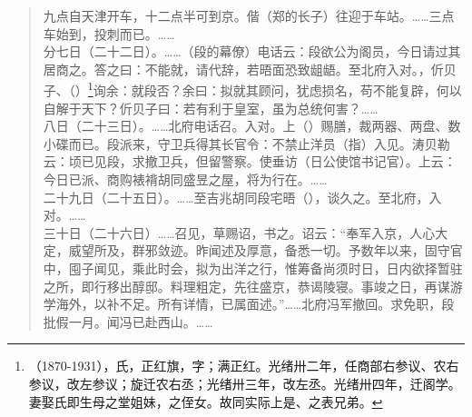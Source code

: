\begin{quote}
	九点自天津开车，十二点半可到京。偕（郑的长子）往迎于车站。……三点车始到，投刺而已。……\\

分七日（二十二日）。……（段的幕僚）电话云：段欲公为阁员，今日请过其居商之。答之曰：不能就，请代辞，若晤面恐致龃龉。至北府入对。，伒贝子、（）\footnote{（1870-1931），氏，正红旗，字；满正红。光绪卅二年，任商部右参议、农右参议，改左参议；旋迁农右丞；光绪卅三年，改左丞。光绪卅四年，迁阁学。妻娶氏即生母之堂姐妹，之侄女。故同实际上是、之表兄弟。}询余：就段否？余曰：拟就其顾问，犹虑损名，苟不能复辟，何以自解于天下？伒贝子曰：若有利于皇室，虽为总统何害？……\\

八日（二十三日）。……北府电话召。入对。上（）赐膳，裁两器、两盘、数小碟而已。段派来，守卫兵得其长官令：不禁止洋员（指）入见。涛贝勒云：顷已见段，求撤卫兵，但留警察。使垂访（日公使馆书记官）。上云：今日已派、商购裱褙胡同盛昱之屋，将为行在。……\\

二十九日（二十五日）。……至吉兆胡同段宅晤（），谈久之。至北府，入对。……\\

三十日（二十六日）……召见，草赐诏，书之。诏云：“奉军入京，人心大定，威望所及，群邪敛迹。昨闻述及厚意，备悉一切。予数年以来，固守官中，囤子闻见，乘此时会，拟为出洋之行，惟筹备尚须时日，日内欲择暂驻之所，即行移出醇邸。料理粗定，先往盛京，恭谒陵寝。事竣之日，再谋游学海外，以补不足。所有详情，已属面述。”……北府冯军撤回。求免职，段批假一月。闻冯已赴西山。……\\
\end{quote}

